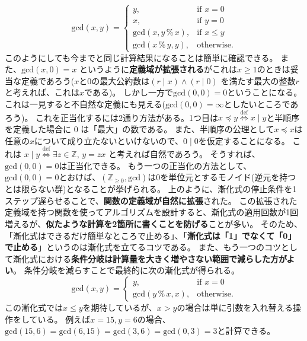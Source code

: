 \documentclass[a4paper,twoside,onecolumn,openany,article,10pt]{memoir}
\theoremstyle{remark}
\begin{document}
\begin{equation}
\mathrm{gcd}(x, y) =
\begin{cases}
y,& \text{if } x = 0\\
x,& \text{if } y = 0\\
\mathrm{gcd}(x, y\, \%\, x),& \text{if } x\le y\\
\mathrm{gcd}(x\, \%\, y, y),& \text{otherwise.}
\end{cases}
\end{equation}
このようにしても今までと同じ計算結果になることは簡単に確認できる。
また、$\mathrm{gcd}(x, 0)=x$ というように\textbf{定義域が拡張される}がこれは$x\ge 1$のときは妥当な定義であろう($x$と0の最大公約数は$(r \mid x)\land (r\mid 0)$
を満たす最大の整数$r$と考えれば、これは$x$である)。
しかし一方で$\mathrm{gcd}(0, 0)=0$ということになる。これは一見すると不自然な定義にも見える($\mathrm{gcd}(0,0)=\infty$としたいところであろう)。
これを正当化するには2通り方法がある。1つ目は$x\preceq y \stackrel{\mathrm{def}}{\iff} x\mid y$と半順序を定義した場合に 0 は「最大」の数である。
また、半順序の公理として$x\preceq x$は任意の$x$について成り立たないといけないので、$0\mid 0$を仮定することになる。
これは $x \mid y\stackrel{\mathrm{def}}{\iff} \exists z\in \mathbb{Z},\, y = zx$ と考えれば自然であろう。
そうすれば、$\mathrm{gcd}(0,0)=0$は正当化できる。
もう一つの正当化の方法として、$\mathrm{gcd}(0,0)=0$とおけば、$(\mathbb{Z}_{\ge 0}, \mathrm{gcd})$は0を単位元とするモノイド(逆元を持つとは限らない群)となることが挙げられる。
上のように、漸化式の停止条件を1ステップ遅らせることで、\textbf{関数の定義域が自然に拡張}された。
この拡張された定義域を持つ関数を使ってアルゴリズムを設計すると、漸化式の適用回数が1回増えるが、\textbf{似たような計算を2箇所に書くことを防げる}ことが多い。
そのため、「漸化式はできるだけ簡単なところで止める」、「\textbf{漸化式は「1」でなくて「0」で止める}」というのは漸化式を立てるコツである。
また、もう一つのコツとして漸化式における\textbf{条件分岐は計算量を大きく増やさない範囲で減らした方がよい}。
条件分岐を減らすことで最終的に次の漸化式が得られる。
\begin{equation}
\mathrm{gcd}(x, y) =
\begin{cases}
y,& \text{if } x = 0\\
\mathrm{gcd}(y\, \%\, x, x),& \text{otherwise.}
\end{cases}
\label{eq:gcd4}
\end{equation}
この漸化式では$x\le y$を期待しているが、$x>y$の場合は単に引数を入れ替える操作をしている。
例えば$x=15, y=6$の場合、$\mathrm{gcd}(15, 6) = \mathrm{gcd}(6, 15) = \mathrm{gcd}(3, 6) = \mathrm{gcd}(0, 3) = 3$と計算できる。
\end{document}
